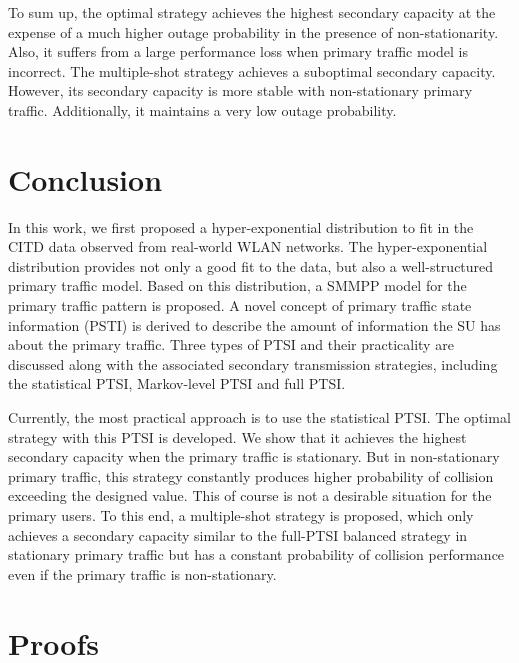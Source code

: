 \documentclass[10pt,final,journal,letterpaper]{IEEEtran}
\begin{document}
\par
To sum up, the optimal strategy achieves the highest secondary capacity at the expense of a much higher outage probability in the presence of non-stationarity. Also, it suffers from a large performance loss when primary traffic model is incorrect. The multiple-shot strategy achieves a suboptimal secondary capacity. However, its secondary capacity is more stable with non-stationary primary traffic. Additionally, it maintains a very low outage probability.

\section{Conclusion}\label{sec:7}
In this work, we first proposed a hyper-exponential distribution to fit in the CITD data observed from real-world WLAN networks. The hyper-exponential distribution provides not only a good fit to the data, but also a well-structured primary traffic model. Based on this distribution, a SMMPP model for the primary traffic pattern is proposed. A novel concept of primary traffic state information (PSTI) is derived to describe the amount of information the SU has about the primary traffic. Three types of PTSI and their practicality are discussed along with the associated secondary transmission strategies, including the statistical PTSI, Markov-level PTSI and full PTSI.

\par
Currently, the most practical approach is to use the statistical PTSI. The optimal strategy with this PTSI is developed. We show that it achieves the highest secondary capacity when the primary traffic is stationary. But in non-stationary primary traffic, this strategy constantly produces higher probability of collision exceeding the designed value. This of course is not a desirable situation for the primary users. To this end, a multiple-shot strategy is proposed, which only achieves a secondary capacity similar to the full-PTSI balanced strategy in stationary primary traffic but has a constant probability of collision performance even if the primary traffic is non-stationary.

\appendices
\section{Proofs}\label{app2}
\end{document}
